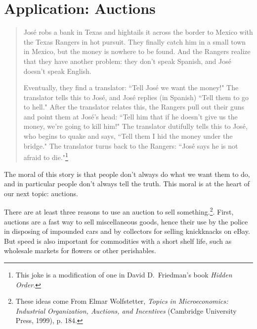 \chapter{Application: Auctions}%
\label{2auctions}   %


\begin{quotation}
\noindent Jos\'{e} robs a bank in Texas and hightails it across the border to Mexico with the Texas Rangers in hot pursuit. They finally catch him in a small town in Mexico, but the money is nowhere to be found. And the Rangers realize that they have another problem: they don't speak Spanish, and Jos\'{e} doesn't speak English.

Eventually, they find a translator: ``Tell Jos\'{e} we want the money!" The translator tells this to Jos\'{e}, and Jos\'{e} replies (in Spanish) ``Tell them to go to hell." After the translator relates this, the Rangers pull out their guns and point them at Jos\'{e}'s head: ``Tell him that if he doesn't give us the money, we're going to kill him!" The translator dutifully tells this to Jos\'{e}, who begins to quake and says, ``Tell them I hid the money under the bridge." The translator turns back to the Rangers: ``Jos\'{e} says he is not afraid to die."\footnote{This joke is a modification of one in David D.\ Friedman's book \emph{Hidden Order}.}
\end{quotation}

\vspace*{.4cm}

The moral of this story is that people don't always do what we want them to do, and in particular people don't always tell the truth. This moral is at the heart of our next topic: auctions.

There are at least three reasons to use an auction to sell something.\footnote{These ideas come From Elmar Wolfstetter, \emph{Topics in Microeconomics: Industrial Organization, Auctions, and Incentives} (Cambridge University Press, 1999), p. 184.}. First, auctions are a fast way to sell miscellaneous goods, hence their use by the police in disposing of impounded cars and by collectors for selling knickknacks on eBay. But speed is also important for commodities with a short shelf life, such as wholesale markets for flowers or other perishables. %

